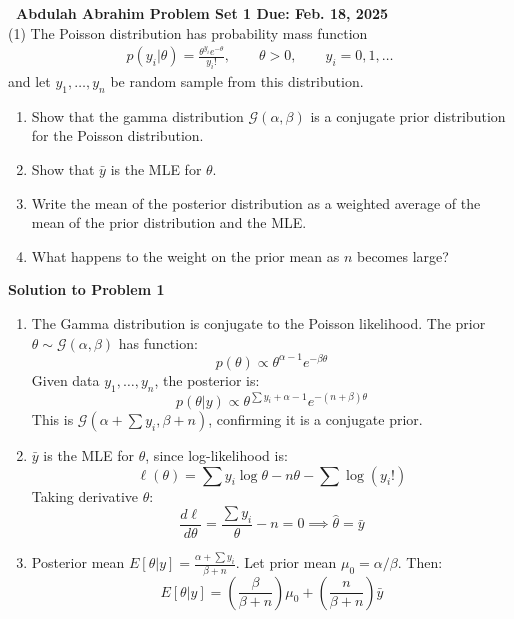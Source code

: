 \documentclass[final,11pt]{article}
\begin{document}
\thispagestyle{empty}
\begin{spacing}{1.25}

\textbf{\ Abdulah Abrahim   Problem Set 1 Due: Feb. 18, 2025}\\

(1) The Poisson distribution has probability mass function
\begin{gather}
    p(y_i|\theta)=\frac{\theta^{y_i}e^{-\theta}}{y_i!},\qquad \theta>0,\qquad y_i=0,1,\ldots
\end{gather}
and let $y_1,\ldots,y_n$ be random sample from this distribution.
\begin{enumerate}
    \item Show that the gamma distribution $\mathcal{G}(\alpha,\beta)$ is a conjugate prior distribution for the Poisson distribution.
    \item Show that $\bar{y}$ is the MLE for $\theta$.
    \item Write the mean of the posterior distribution as a weighted average of the mean of the prior distribution and the MLE.
    \item What happens to the weight on the prior mean as $n$ becomes large?
\end{enumerate}
\textbf{Solution to Problem 1}

\begin{enumerate}
    \item The Gamma distribution is conjugate to the Poisson likelihood. The prior $\theta \sim \mathcal{G}(\alpha, \beta)$ has function:
    \[
        p(\theta) \propto \theta^{\alpha-1} e^{-\beta\theta}
    \]
    Given data $y_1, \ldots, y_n$, the posterior is:
    \[
        p(\theta | y) \propto \theta^{\sum y_i + \alpha -1} e^{-(n + \beta)\theta}
    \]
    This is $\mathcal{G}(\alpha + \sum y_i, \beta + n)$, confirming it is a conjugate prior.

    \item $\bar{y}$ is the MLE for $\theta$, since log-likelihood is:
    \[
        \ell(\theta) = \sum y_i \log\theta - n\theta - \sum \log(y_i!)
    \]
    Taking derivative $\theta$:
    \[
        \frac{d\ell}{d\theta} = \frac{\sum y_i}{\theta} - n = 0 \implies \hat{\theta} = \bar{y}
    \]
    
    \item Posterior mean $E[\theta | y] = \frac{\alpha + \sum y_i}{\beta + n}$. Let prior mean $\mu_0 = \alpha/\beta$. Then:
    \[
        E[\theta | y] = \left(\frac{\beta}{\beta + n}\right)\mu_0 + \left(\frac{n}{\beta + n}\right)\bar{y}
    \]
    

\end{enumerate}
\end{spacing}
\end{document}
